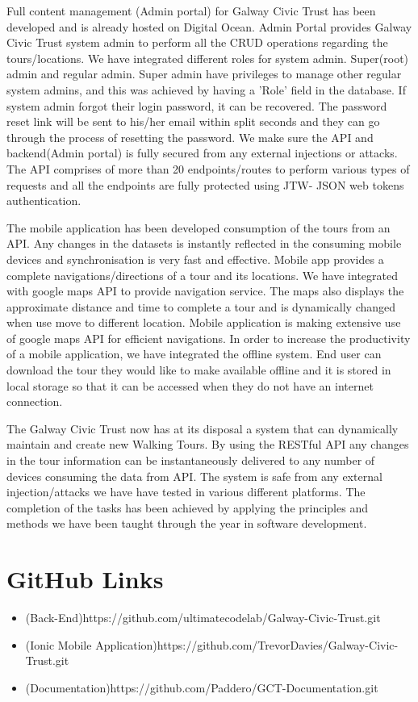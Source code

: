 Full content management (Admin portal) for Galway Civic Trust has been developed and is already hosted on Digital Ocean. Admin Portal provides Galway Civic Trust system admin to perform all the CRUD operations regarding the tours/locations. We have integrated different roles for system admin. Super(root) admin and regular admin. Super admin have privileges to manage other regular system admins, and this was achieved by having a 'Role' field in the database. If system admin forgot their login password, it can be recovered. The password reset link will be sent to his/her email within split seconds and they can go through the process of resetting the password. 
We make sure the API and backend(Admin portal) is fully secured from any external injections or attacks. The API comprises of more than 20 endpoints/routes to perform various types of requests and all the endpoints are fully protected using JTW- JSON web tokens authentication. 


The mobile application has been developed consumption of the tours from an API. Any changes in the datasets is instantly reflected in the consuming mobile devices and synchronisation is very fast and effective. Mobile app provides a complete navigations/directions of a tour and its locations. We have integrated with google maps API to provide navigation service. The maps also displays the approximate distance and time to complete a tour and is dynamically changed when use move to different location. Mobile application is making extensive use of google maps API for efficient navigations. 
In order to increase the productivity of a mobile application, we have integrated the offline system. End user can download the tour they would like to make available offline and it is stored in local storage so that it can be accessed when they do not have an internet connection. 
 
The Galway Civic Trust now has at its disposal a system that can dynamically maintain and create new Walking Tours. By using the RESTful API any changes in the tour information can be instantaneously delivered to any number of devices consuming the data from API. The system is safe from any external injection/attacks we have have tested in various different platforms.  
The completion of the tasks has been achieved by applying the principles and methods we have been taught through the year in software development.  


\chapter{GitHub Links}
\begin{itemize}
	\item{(Back-End)https://github.com/ultimatecodelab/Galway-Civic-Trust.git}
	\item{(Ionic Mobile Application)https://github.com/TrevorDavies/Galway-Civic-Trust.git}
	\item{(Documentation)https://github.com/Paddero/GCT-Documentation.git}
\end{itemize}
